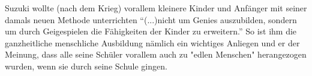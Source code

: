 Suzuki wollte (nach dem Krieg) vorallem kleinere Kinder und Anfänger mit seiner
damals neuen Methode unterrichten \enquote{(...)nicht um Genies auszubilden, sondern um
durch Geigespielen die Fähigkeiten der Kinder zu erweitern.}
\autocite[43]{suzuki:erziehung_ist_liebe}So
ist ihm die ganzheitliche menschliche Ausbildung nämlich ein wichtiges Anliegen
und er der Meinung, dass alle seine Schüler vorallem auch zu "edlen Menschen"
herangezogen wurden, wenn sie durch seine Schule gingen. 










